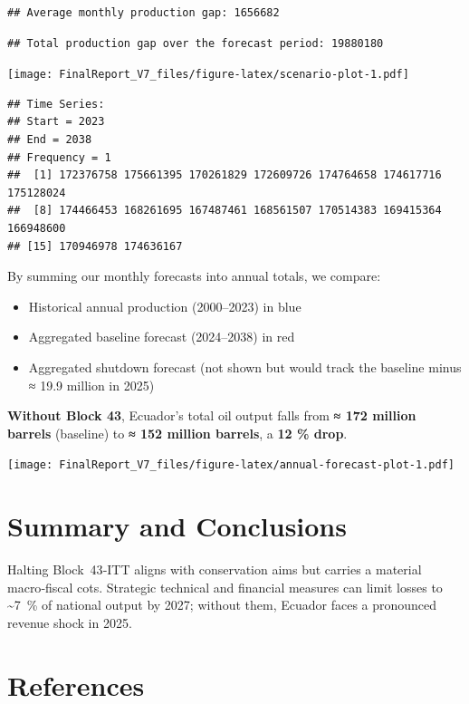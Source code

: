 \documentclass[
]{article}
\begin{document}
\begin{verbatim}
## Average monthly production gap: 1656682
\end{verbatim}

\begin{verbatim}
## Total production gap over the forecast period: 19880180
\end{verbatim}

\texttt{[image: FinalReport\_V7\_files/figure-latex/scenario-plot-1.pdf]}

\begin{verbatim}
## Time Series:
## Start = 2023 
## End = 2038 
## Frequency = 1 
##  [1] 172376758 175661395 170261829 172609726 174764658 174617716 175128024
##  [8] 174466453 168261695 167487461 168561507 170514383 169415364 166948600
## [15] 170946978 174636167
\end{verbatim}

By summing our monthly forecasts into annual totals, we compare:

\begin{itemize}
\item
  Historical annual production (2000--2023) in blue
\item
  Aggregated baseline forecast (2024--2038) in red
\item
  Aggregated shutdown forecast (not shown but would track the baseline
  minus ≈ 19.9 million in 2025)
\end{itemize}

\textbf{Without Block 43}, Ecuador's total oil output falls from
\textbf{≈ 172 million barrels} (baseline) to \textbf{≈ 152 million
barrels}, a \textbf{12 \% drop}.

\texttt{[image: FinalReport\_V7\_files/figure-latex/annual-forecast-plot-1.pdf]}

\section{Summary and Conclusions}\label{summary-and-conclusions}

Halting Block~43‑ITT aligns with conservation aims but carries a
material macro‑fiscal cots. Strategic technical and financial measures
can limit losses to \textasciitilde7~\% of national output by 2027;
without them, Ecuador faces a pronounced revenue shock in 2025.

\section*{References}\label{references}
\end{document}
